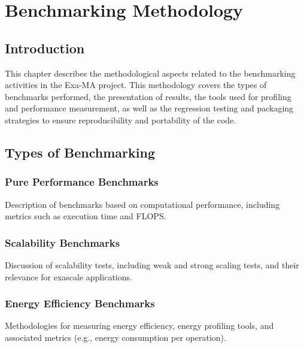 
\chapter{Benchmarking Methodology}
\label{chap:methodology}

\section{Introduction}
\label{sec:methodology-intro}

This chapter describes the methodological aspects related to the benchmarking activities in the Exa-MA project. 
This methodology covers the types of benchmarks performed, the presentation of results, the tools used for profiling and performance measurement, as well as the regression testing and packaging strategies to ensure reproducibility and portability of the code.

\section{Types of Benchmarking}
\label{sec:methodology-types}

\subsection{Pure Performance Benchmarks}
\label{sec:methodology-types-performance}
Description of benchmarks based on computational performance, including metrics such as execution time and FLOPS.

\subsection{Scalability Benchmarks}
\label{sec:methodology-types-scalability}

Discussion of scalability tests, including weak and strong scaling tests, and their relevance for exascale applications.

\subsection{Energy Efficiency Benchmarks}
\label{sec:methodology-types-energy}


Methodologies for measuring energy efficiency, energy profiling tools, and associated metrics (e.g., energy consumption per operation).

